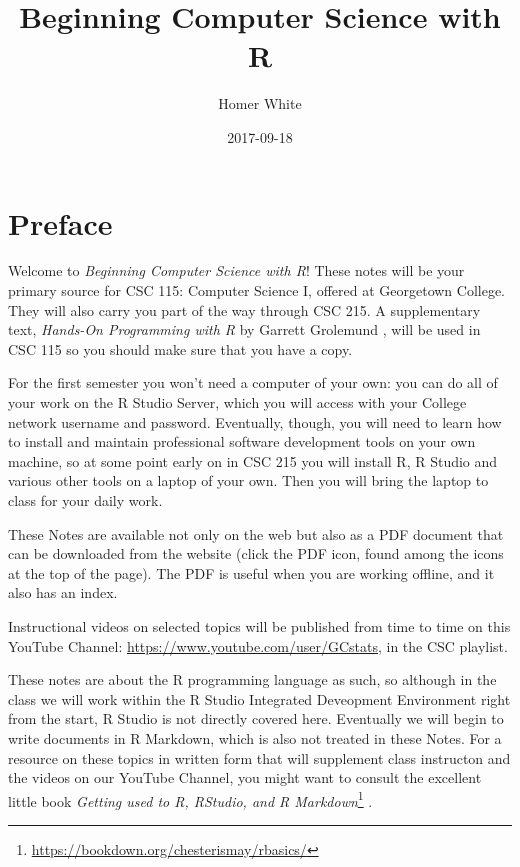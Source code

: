 \documentclass[]{book}
\title{Beginning Computer Science with R}
\author{Homer White}
\date{2017-09-18}
\let\rmarkdownfootnote\footnote%
\def\footnote{\protect\rmarkdownfootnote}
\renewcommand{\href}[2]{#2\footnote{\url{#1}}}
\renewcommand{\href}[2]{#2\footnote{\url{#1}}}
\theoremstyle{definition}
\theoremstyle{definition}
\theoremstyle{definition}
\theoremstyle{remark}
\begin{document}
\maketitle

{
\setcounter{tocdepth}{1}
\tableofcontents
}
\chapter*{Preface}\label{preface}

Welcome to \emph{Beginning Computer Science with R}! These notes will be
your primary source for CSC 115: Computer Science I, offered at
Georgetown College. They will also carry you part of the way through CSC
215. A supplementary text, \emph{Hands-On Programming with R} by Garrett
Grolemund \citep{Grolemund2014}, will be used in CSC 115 so you should
make sure that you have a copy.

For the first semester you won't need a computer of your own: you can do
all of your work on the R Studio Server, which you will access with your
College network username and password. Eventually, though, you will need
to learn how to install and maintain professional software development
tools on your own machine, so at some point early on in CSC 215 you will
install R, R Studio and various other tools on a laptop of your own.
Then you will bring the laptop to class for your daily work.

These Notes are available not only on the web but also as a PDF document
that can be downloaded from the website (click the PDF icon, found among
the icons at the top of the page). The PDF is useful when you are
working offline, and it also has an index.

Instructional videos on selected topics will be published from time to
time on this YouTube Channel:
\url{https://www.youtube.com/user/GCstats}, in the CSC playlist.

These notes are about the R programming language as such, so although in
the class we will work within the R Studio Integrated Deveopment
Environment right from the start, R Studio is not directly covered here.
Eventually we will begin to write documents in R Markdown, which is also
not treated in these Notes. For a resource on these topics in written
form that will supplement class instructon and the videos on our YouTube
Channel, you might want to consult the excellent little book
\href{https://bookdown.org/chesterismay/rbasics/}{\emph{Getting used to
R, RStudio, and R Markdown}} \citep{Ismay2016}.
\end{document}
